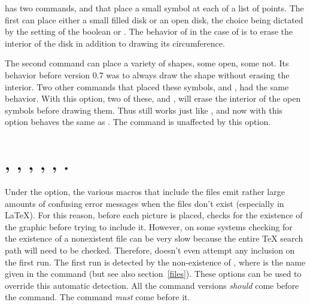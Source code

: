 \documentclass[letterpaper]{article}
\begin{document}
\Mfp{} has two commands,  and  that place a
small symbol at each of a list of points. The first can place either a
small filled disk or an open disk, the choice being dictated by the
setting of the boolean  or . The
behavior of  in the case of  is to erase the
interior of the disk in addition to drawing its circumference.

The second command  can place a variety of shapes, some
open, some not. Its behavior before version 0.7 was to always draw the
shape without erasing the interior. Two other commands that placed these
symbols,  and , had the same behavior. With this
option, two of these,  and , will erase the
interior of the open symbols before drawing them. Thus
 still works just like
, and now with this option
 behaves the same as
. The  command is unaffected by
this option.


\section{, , , ,
    , .}\label{draft}
%
%
%
%
%

Under the  option, the various macros that include the
\EPS{} files emit rather large amounts of confusing error messages when
the files don't exist (especially in \LaTeX{}). For this reason, before
each picture is placed, \mfp{} checks for the existence of the graphic
before trying to include it. However, on some systems checking for the
existence of a nonexistent file can be very slow because the entire
\TeX{} search path will need to be checked. Therefore, \mfp{} doesn't
even attempt any inclusion on the first run. The first run is detected
by the non-existence of , where  is the
name given in the  command (but see also
section~\ref{files}). These options can be used to override this
automatic detection. All the command versions \emph{should} come before
the  command. The  command
\emph{must} come before it.
\end{document}
